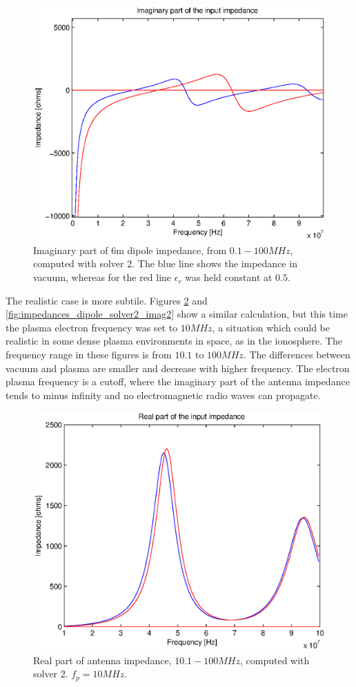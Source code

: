 \documentclass[a4paper,11pt]{article}
\begin{document}
\begin{figure}
\includegraphics[width=12cm]{imps_dipole_solver2_imag.eps}
\caption{Imaginary part of 6m dipole impedance, from $0.1 - 100 MHz$, computed with solver 2. The blue line shows the impedance in vacuum, whereas for the red line $\epsilon_r$ was held constant at $0.5$.}
\label{fig:impedances_dipole_solver2_imag}
\end{figure}

The realistic case is more subtile. Figures \ref{fig:impedances_dipole_solver2_real2} and \ref{fig:impedances_dipole_solver2_imag2} show a similar calculation, but this time the plasma electron frequency was set to $10MHz$, a situation which could be realistic in some dense plasma environments in space, as in the ionosphere. The frequency range in these figures is from $10.1$ to $100MHz$. The differences between vacuum and plasma are smaller and decrease with higher frequency. The electron plasma frequency is a cutoff, where the imaginary part of the antenna impedance tends to minus infinity and no electromagnetic radio waves can propagate.

\begin{figure}
  \includegraphics[width=12cm]{imps_dipole_solver2_real2.eps}
\caption{Real part of antenna impedance, $10.1 - 100 MHz$, computed with solver 2. $f_p=10MHz$.}
\label{fig:impedances_dipole_solver2_real2}
\end{figure}
\end{document}
